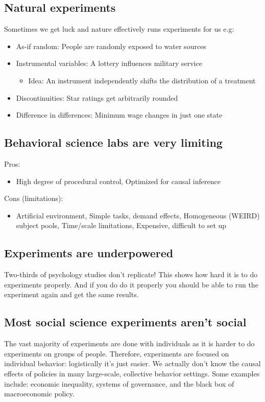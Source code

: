 \subsection{Natural experiments}
Sometimes we get luck and nature effectively runs experiments for us e.g:
	\begin{itemize}
    	\item As-if random: People are randomly exposed to water sources
        \item Instrumental variables: A lottery influences military service
        	\begin{itemize}
            	\item Idea: An instrument independently shifts the distribution of a treatment
            \end{itemize}
        \item Discontinuities: Star ratings get arbitrarily rounded
        \item Difference in differences: Minimum wage changes in just one state
    \end{itemize}
\subsection{Behavioral science labs are very limiting}
Pros: 
	\begin{itemize}
		\item High degree of procedural control, Optimized for causal inference
	\end{itemize}
Cons (limitations):
	\begin{itemize}
		\item Artificial environment, Simple tasks, demand effects, Homogeneous (WEIRD) subject pools, Time/scale limitations, Expensive, difficult to set up
	\end{itemize}


\subsection{Experiments are underpowered}
Two-thirds of psychology studies don't replicate! This shows how hard it is to do experiments properly. And if you do do it properly you should be able to run the experiment again and get the same results.

\subsection{Most social science experiments aren't social}
The vast majority of experiments are done with individuals as it is harder to do experiments on groups of people. Therefore, experiments are focused on individual behavior: logistically it's just easier. We actually don't know the causal effects of policies in many large-scale, collective behavior settings. Some examples include: economic inequality, systems of governance, and the black box of macroeconomic policy.


